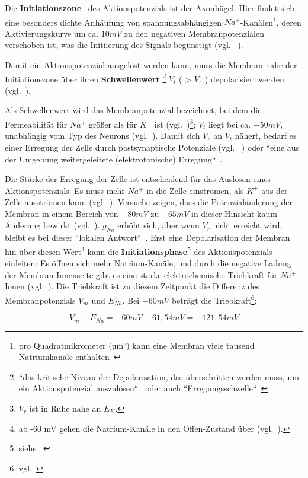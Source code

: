 {Die \textbf{Initiationszone}~\cite[111]{BCP18} des Aktionspotenzials ist der Axonhügel. Hier findet sich eine besonders dichte Anhäufung von spannungsabhängigen $Na^+$-Kanälen\footnote{
 pro Quadratmikrometer (µm²) kann eine Membran viele tausend Natriumkanäle enthalten~\cite[99]{BCP18}
}, deren Aktivierungskurve um ca. $10 mV$ zu den negativen Membranpotenzialen verschoben ist, was die Initiierung des Signals begünstigt (vgl. ~\cite[77]{Jon19}).

Damit ein Aktionspotenzial ausgelöst werden kann, muss die Membran nahe der Initiationszone über ihren \textbf{Schwellenwert} \footnote{
 ``das kritische Niveau der Depolarisation, das überschritten werden muss, um ein Aktionspotenzial auszulösen``~\cite[88]{BCP18} oder auch ``Erregungsschwelle``~\cite[69]{FE19}
} $V_t$ ( > $V_r$ ) depolarisiert werden (vgl.~\cite[111]{BCP18}).


 Als Schwellenwert wird das Membranpotenzial bezeichnet, bei dem die Permeabilität für $Na^+$ größer als für $K^+$ ist (vgl.~\cite[103]{BCP18})\footnote{$V_r$ ist in Ruhe nahe an $E_K$.}; $V_t$ liegt bei ca. $- 50mV$, unabhängig vom Typ des Neurons (vgl.~\cite[75]{Jon19}).
 Damit sich $V_r$ an $V_t$ nähert, bedarf es einer Erregung der Zelle durch postsynaptische Potenziale (vgl. ~\cite[69]{FE19}) oder ``eine aus der Umgebung weitergeleitete (elektrotonische) Erregung``~\cite[46]{SD07}.

Die Stärke der Erregung der Zelle ist entscheidend für das Auslösen eines Aktionspotenzials. Es muss mehr $Na^+$ in die Zelle einströmen, als $K^+$ aus der Zelle ausströmen kann (vgl.~\cite[69]{FE19}).
Versuche zeigen, dass die Potenzialänderung der Membran in einem Bereich von $-80 mV$ zu $-65 mV$ in dieser Hinsicht kaum Änderung bewirkt (vgl.~\cite[99]{BCP18}). $g_{Na}$ erhöht sich, aber wenn $V_r$ nicht erreicht wird, bleibt es bei dieser ``lokalen Antwort``~\cite[46]{SD07}. Erst eine Depolarisation der Membran hin über diesen Wert\footnote{
 ab -60 mV gehen die Natrium-Kanäle in den Offen-Zustand über (vgl.~\cite[69]{FE19}).
} kann die \textbf{Initiationsphase}\footnote{siehe ~\cite[68]{FE19}} des Aktionspotenzials einleiten: Es öffnen sich mehr Natrium-Kanäle, und durch die negative Ladung der Membran-Innenseite gibt es eine starke elektrochemische Triebkraft für $Na^+$-Ionen (vgl.~\cite[103]{BCP18}). Die Triebkraft ist zu diesem Zeitpunkt die Differenz des Membranpotenzials $V_m$ und $E_{Na}$. Bei $-60 mV$ beträgt die Triebkraft\footnote{
 vgl.~\cite[39]{Fak19}
}:

 \begin{equation}
  V_m - E_{Na} = -60 mV - 61,54 mV = -121,54 mV
  \label{eq:gl-triebkraft}
 \end{equation}


}
